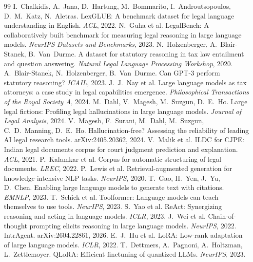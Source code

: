 \documentclass[10pt,a4paper]{article}
\begin{document}
\small
\begin{thebibliography}{99}\setlength{\itemsep}{1pt}
 I.~Chalkidis, A.~Jana, D.~Hartung, M.~Bommarito, I.~Androutsopoulos, D.~M.~Katz, N.~Aletras. LexGLUE: A benchmark dataset for legal language understanding in English. \emph{ACL}, 2022.
 N.~Guha et al. LegalBench: A collaboratively built benchmark for measuring legal reasoning in large language models. \emph{NeurIPS Datasets and Benchmarks}, 2023.
 N.~Holzenberger, A.~Blair-Stanek, B.~Van~Durme. A dataset for statutory reasoning in tax law entailment and question answering. \emph{Natural Legal Language Processing Workshop}, 2020.
 A.~Blair-Stanek, N.~Holzenberger, B.~Van~Durme. Can GPT-3 perform statutory reasoning? \emph{ICAIL}, 2023.
 J.~J.~Nay et al. Large language models as tax attorneys: a case study in legal capabilities emergence. \emph{Philosophical Transactions of the Royal Society A}, 2024.
 M.~Dahl, V.~Magesh, M.~Suzgun, D.~E.~Ho. Large legal fictions: Profiling legal hallucinations in large language models. \emph{Journal of Legal Analysis}, 2024.
 V.~Magesh, F.~Surani, M.~Dahl, M.~Suzgun, C.~D.~Manning, D.~E.~Ho. Hallucination-free? Assessing the reliability of leading AI legal research tools. arXiv:2405.20362, 2024.
 V.~Malik et al. ILDC for CJPE: Indian legal documents corpus for court judgment prediction and explanation. \emph{ACL}, 2021.
 P.~Kalamkar et al. Corpus for automatic structuring of legal documents. \emph{LREC}, 2022.
 P.~Lewis et al. Retrieval-augmented generation for knowledge-intensive NLP tasks. \emph{NeurIPS}, 2020.
 T.~Gao, H.~Yen, J.~Yu, D.~Chen. Enabling large language models to generate text with citations. \emph{EMNLP}, 2023.
 T.~Schick et al. Toolformer: Language models can teach themselves to use tools. \emph{NeurIPS}, 2023.
 S.~Yao et al. ReAct: Synergizing reasoning and acting in language models. \emph{ICLR}, 2023.
 J.~Wei et al. Chain-of-thought prompting elicits reasoning in large language models. \emph{NeurIPS}, 2022.
 IntrAgent. arXiv:2604.22861, 2026. %
 E.~J.~Hu et al. LoRA: Low-rank adaptation of large language models. \emph{ICLR}, 2022.
 T.~Dettmers, A.~Pagnoni, A.~Holtzman, L.~Zettlemoyer. QLoRA: Efficient finetuning of quantized LLMs. \emph{NeurIPS}, 2023.

\end{thebibliography}
\end{document}
